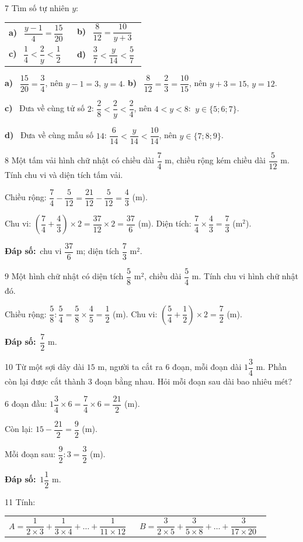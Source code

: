 \documentclass[11pt]{article}
\makeatletter
\newif\ifsol \solfalse
\renewcommand{\arraystretch}{1.35}
\providecommand{\AnsWord}{Đáp số}
\newcommand{\dapso}[1]{\par\textbf{\AnsWord:}\ #1}
\newcommand{\probsol}[1]{%
  \begin{lrbox}{\solmeasure}\begin{minipage}{\dimexpr\linewidth-24pt\relax}#1\end{minipage}\end{lrbox}%
  \ifsol
    \begin{solbox}#1\end{solbox}%
  \else
    \setlength{\solht}{\dimexpr\ht\solmeasure+\dp\solmeasure+0.85cm\relax}%
    \ifdim\solht<1.35cm\setlength{\solht}{1.35cm}\fi
    \begin{tcolorbox}[colback=white,colframe=Line,boxrule=0.8pt,arc=5pt,
      left=8pt,right=8pt,top=4pt,bottom=4pt,height=\solht]{\footnotesize\color{Slate}\itshape\WorkWord}\end{tcolorbox}%
  \fi}
\newcommand{\pa}[1]{\textbf{#1)}\ }
\newenvironment{cols2}{\par\vspace{3pt}\noindent\setlength{\tabcolsep}{0pt}\renewcommand{\arraystretch}{1.3}%
  \begin{tabular}{@{}>{\raggedright\arraybackslash\rule{0pt}{4.4ex}}p{0.48\linewidth}<{\rule[-2.3ex]{0pt}{0pt}}@{\hspace{0.03\linewidth}}>{\raggedright\arraybackslash\rule{0pt}{4.4ex}}p{0.48\linewidth}<{\rule[-2.3ex]{0pt}{0pt}}@{}}}%
  {\end{tabular}\par}
\newcommand{\gap}{\vspace{0.3cm}}
\def\WorkWord{Bài làm:}
\def\AnsWord{Đáp số}
\makeatother
\begin{document}
\gap
\begin{probbox}{7}{\relax}
Tìm số tự nhiên $y$:
\begin{cols2}
\pa{a} $\dfrac{y-1}{4}=\dfrac{15}{20}$ & \pa{b} $\dfrac8{12}=\dfrac{10}{y+3}$\\
\pa{c} $\dfrac14<\dfrac2y<\dfrac12$ & \pa{d} $\dfrac37<\dfrac{y}{14}<\dfrac57$
\end{cols2}
\end{probbox}
\probsol{
\pa{a} $\dfrac{15}{20}=\dfrac34$, nên $y-1=3$, $y=4$. \qquad \pa{b} $\dfrac8{12}=\dfrac23=\dfrac{10}{15}$, nên $y+3=15$, $y=12$.\par
\pa{c} Đưa về cùng tử số $2$: $\dfrac28<\dfrac2y<\dfrac24$, nên $4<y<8$: $\ y\in\{5;6;7\}$.\par
\pa{d} Đưa về cùng mẫu số $14$: $\dfrac6{14}<\dfrac y{14}<\dfrac{10}{14}$, nên $y\in\{7;8;9\}$.
}
\gap
\begin{probbox}{8}{\relax}
Một tấm vải hình chữ nhật có chiều dài $\dfrac74$ m, chiều rộng kém chiều dài $\dfrac5{12}$ m. Tính chu vi và diện tích tấm vải.
\end{probbox}
\probsol{
Chiều rộng: $\dfrac74-\dfrac5{12}=\dfrac{21}{12}-\dfrac5{12}=\dfrac43$ (m).\par
Chu vi: $\left(\dfrac74+\dfrac43\right)\times2=\dfrac{37}{12}\times2=\dfrac{37}6$ (m). \quad Diện tích: $\dfrac74\times\dfrac43=\dfrac73$ (m$^2$).
\dapso{chu vi $\dfrac{37}6$ m; diện tích $\dfrac73$ m$^2$.}}
\gap
\begin{probbox}{9}{\relax}
Một hình chữ nhật có diện tích $\dfrac58$ m$^2$, chiều dài $\dfrac54$ m. Tính chu vi hình chữ nhật đó.
\end{probbox}
\probsol{
Chiều rộng: $\dfrac58:\dfrac54=\dfrac58\times\dfrac45=\dfrac12$ (m). \quad Chu vi: $\left(\dfrac54+\dfrac12\right)\times2=\dfrac72$ (m).
\dapso{$\dfrac72$ m.}}
\gap
\begin{probbox}{10}{\relax}
Từ một sợi dây dài $15$ m, người ta cắt ra $6$ đoạn, mỗi đoạn dài $1\dfrac34$ m. Phần còn lại được cắt thành $3$ đoạn bằng nhau. Hỏi mỗi đoạn sau dài bao nhiêu mét?
\end{probbox}
\probsol{
$6$ đoạn đầu: $1\dfrac34\times6=\dfrac74\times6=\dfrac{21}2$ (m).\par Còn lại: $15-\dfrac{21}2=\dfrac92$ (m).\par
Mỗi đoạn sau: $\dfrac92:3=\dfrac32$ (m).
\dapso{$1\dfrac12$ m.}}
\gap
\begin{probbox}{11}{\relax}
Tính:
\begin{cols2}
$A=\dfrac1{2\times3}+\dfrac1{3\times4}+\dots+\dfrac1{11\times12}$ & $B=\dfrac3{2\times5}+\dfrac3{5\times8}+\dots+\dfrac3{17\times20}$
\end{cols2}
\end{probbox}
\end{document}
